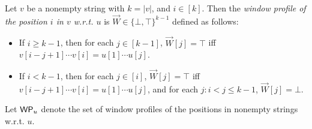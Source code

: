 %
%
%


\begin{definition}
Let $v$ be a nonempty string with $k=|v|$, and $i \in [k]$. Then the \emph{window profile of the position $i$ in $v$ w.r.t. $u$} is $\overrightarrow{W}  \in \{\bot,\top\}^{k-1}$ defined as follows:
\begin{itemize}
\item If $i \ge k-1$, then for each $j \in [k-1]$, $\overrightarrow{W}[j] = \top$ iff $v[i-j+1] \cdots v[i]=u[1] \cdots u[j]$.
%
\item If $i < k-1$, then for each $j \in [i]$, $\overrightarrow{W}[j] = \top$ iff $v[i-j+1] \cdots v[i]=u[1] \cdots u[j]$, and for each $j: i < j \le k-1$, $\overrightarrow{W}[j] = \bot$.
\end{itemize}
Let $\mathsf{WP}_{u}$ denote the set of window profiles of the positions in nonempty strings w.r.t. $u$.
\end{definition}


